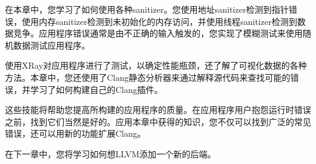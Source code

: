 在本章中，您学习了如何使用各种sanitizer。您使用地址sanitizer检测到指针错误，使用内存sanitizer检测到未初始化的内存访问，并使用线程sanitizer检测到数据竞争。应用程序错误通常是由不正确的输入触发的，您实现了模糊测试来使用随机数据测试应用程序。\par

使用XRay对应用程序进行了测试，以确定性能瓶颈，还了解了可视化数据的各种方法。本章中，您还使用了Clang静态分析器来通过解释源代码来查找可能的错误，并学习了如何构建自己的Clang插件。\par

这些技能将帮助您提高所构建的应用程序的质量。在应用程序用户抱怨运行时错误之前，找到它们当然是好的。应用本章中获得的知识，您不仅可以找到广泛的常见错误，还可以用新的功能扩展Clang。\par

在下一章中，您将学习如何想LLVM添加一个新的后端。\par

\newpage